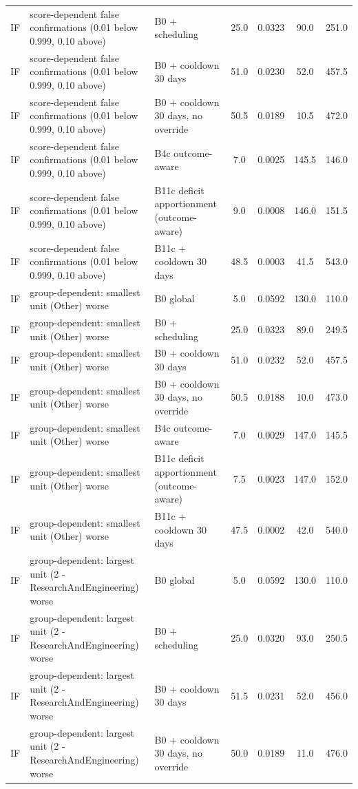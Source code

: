 \begin{longtable}{lp{5.2cm}p{4.4cm}cccc}
IF & score-dependent false confirmations (0.01 below 0.999, 0.10 above) & B0 + scheduling & 25.0 & 0.0323 & 90.0 & 251.0 \\
IF & score-dependent false confirmations (0.01 below 0.999, 0.10 above) & B0 + cooldown 30 days & 51.0 & 0.0230 & 52.0 & 457.5 \\
IF & score-dependent false confirmations (0.01 below 0.999, 0.10 above) & B0 + cooldown 30 days, no override & 50.5 & 0.0189 & 10.5 & 472.0 \\
IF & score-dependent false confirmations (0.01 below 0.999, 0.10 above) & B4c outcome-aware & 7.0 & 0.0025 & 145.5 & 146.0 \\
IF & score-dependent false confirmations (0.01 below 0.999, 0.10 above) & B11c deficit apportionment (outcome-aware) & 9.0 & 0.0008 & 146.0 & 151.5 \\
IF & score-dependent false confirmations (0.01 below 0.999, 0.10 above) & B11c + cooldown 30 days & 48.5 & 0.0003 & 41.5 & 543.0 \\
IF & group-dependent: smallest unit (Other) worse & B0 global & 5.0 & 0.0592 & 130.0 & 110.0 \\
IF & group-dependent: smallest unit (Other) worse & B0 + scheduling & 25.0 & 0.0323 & 89.0 & 249.5 \\
IF & group-dependent: smallest unit (Other) worse & B0 + cooldown 30 days & 51.0 & 0.0232 & 52.0 & 457.5 \\
IF & group-dependent: smallest unit (Other) worse & B0 + cooldown 30 days, no override & 50.5 & 0.0188 & 10.0 & 473.0 \\
IF & group-dependent: smallest unit (Other) worse & B4c outcome-aware & 7.0 & 0.0029 & 147.0 & 145.5 \\
IF & group-dependent: smallest unit (Other) worse & B11c deficit apportionment (outcome-aware) & 7.5 & 0.0023 & 147.0 & 152.0 \\
IF & group-dependent: smallest unit (Other) worse & B11c + cooldown 30 days & 47.5 & 0.0002 & 42.0 & 540.0 \\
IF & group-dependent: largest unit (2 - ResearchAndEngineering) worse & B0 global & 5.0 & 0.0592 & 130.0 & 110.0 \\
IF & group-dependent: largest unit (2 - ResearchAndEngineering) worse & B0 + scheduling & 25.0 & 0.0320 & 93.0 & 250.5 \\
IF & group-dependent: largest unit (2 - ResearchAndEngineering) worse & B0 + cooldown 30 days & 51.5 & 0.0231 & 52.0 & 456.0 \\
IF & group-dependent: largest unit (2 - ResearchAndEngineering) worse & B0 + cooldown 30 days, no override & 50.0 & 0.0189 & 11.0 & 476.0 \\

\end{longtable}
